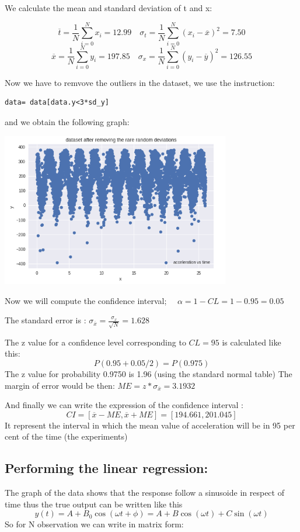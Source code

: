 \documentclass[12pt,a4paper]{report}
\begin{document}
We calculate the mean and standard deviation of t and x:

$$ \overline{t}= \frac{1}{N}\sum_{i=0}^N x_i= 12.99 \quad \sigma_t = \frac{1}{N} \sum_{i=0}^N (x_i - \overline{x})^2=7.50  $$
$$ \overline{x}= \frac{1}{N}\sum_{i=0}^N y_i= 197.85 \quad \sigma_x = \frac{1}{N} \sum_{i=0}^N (y_i - \overline{y})^2=126.55  $$

Now we have to remvove the outliers in the dataset, we use the instruction:
\begin{verbatim}
data= data[data.y<3*sd_y]
\end{verbatim}

and we obtain the following graph:
\begin{center}
\includegraphics[width=10cm]{Capture2.png}
\end{center}

Now we will compute the confidence interval; $\quad \alpha = 1 - CL = 1-0.95 = 0.05$

The standard error is : $ \sigma_{\overline{x}} = \frac{\sigma_x}{\sqrt{N}}= 1.628 $

The z value for a confidence level corresponding to $CL=95$ is calculated like this:
 $$ P(0.95 + 0.05/2)= P(0.975) $$  
The z value for probability 0.9750 is 1.96 (using the standard normal table) 
The margin of error would be then: $ ME= z*\sigma_{\overline{x}}= 3.1932 $

And finally we can write the expression of the confidence interval :
$$CI = [\overline{x}- ME, \overline{x} + ME] = [194.661, 201.045]$$
It represent the interval in which the mean value of acceleration will be in 95 per cent of the time (the experiments)
 
\subsection{Performing the linear regression:}  
The graph of the data shows that the response follow a sinusoide in respect of time thus the true output can be written like this $$y(t)= A + B_0 \cos (\omega t+ \phi) = A + B \cos (\omega t) + C \sin(\omega t)$$ 
So for N observation we can write in matrix form:
\end{document}
